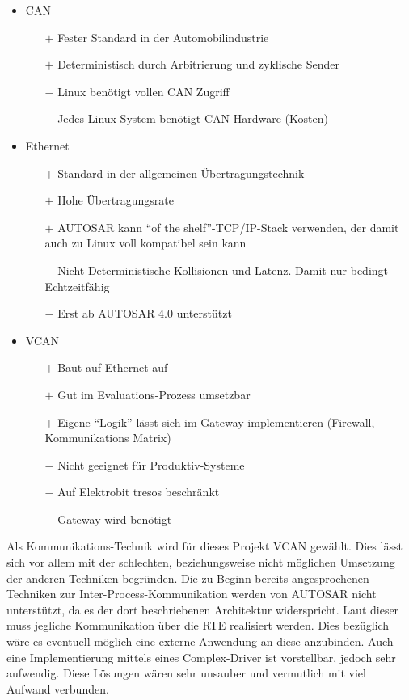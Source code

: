 \documentclass[
  a4paper,					    %
  twoside,
  DIV=calc,     				%
  bibliography=totoc,
  cleardoublepage=empty,
  ngerman,     					%
  final       					%
]{scrbook}
\begin{document}
\begin{itemize}
    \item CAN
    \begin{itemize}
        \item[$+$] Fester Standard in der Automobilindustrie
        \item[$+$] Deterministisch durch Arbitrierung und zyklische Sender
        \item[$-$] Linux benötigt vollen CAN Zugriff
        \item[$-$] Jedes Linux-System benötigt CAN-Hardware (Kosten)
    \end{itemize}
    \item Ethernet
    \begin{itemize}
        \item[$+$] Standard in der allgemeinen Übertragungstechnik
        \item[$+$] Hohe Übertragungsrate
        \item[$+$] AUTOSAR kann "`of the shelf"'-TCP/IP-Stack verwenden, der damit auch zu Linux voll kompatibel sein kann\cite[S. 21]{autosar_eth}
        \item[$-$] Nicht-Deterministische Kollisionen und Latenz. Damit nur bedingt Echtzeitfähig
        \item[$-$] Erst ab AUTOSAR 4.0 unterstützt
    \end{itemize}
    \item VCAN
    \begin{itemize}
        \item[$+$] Baut auf Ethernet auf
        \item[$+$] Gut im Evaluations-Prozess umsetzbar
        \item[$+$] Eigene "`Logik"' lässt sich im Gateway implementieren (Firewall, Kommunikations Matrix)
        \item[$-$] Nicht geeignet für Produktiv-Systeme
        \item[$-$] Auf Elektrobit tresos beschränkt
        \item[$-$] Gateway wird benötigt
    \end{itemize}
\end{itemize}

Als Kommunikations-Technik wird für dieses Projekt VCAN gewählt. Dies lässt sich vor allem mit der schlechten, beziehungsweise nicht möglichen Umsetzung der anderen Techniken begründen. Die zu Beginn bereits angesprochenen Techniken zur Inter-Process-Kommunikation werden von AUTOSAR nicht unterstützt, da es der dort beschriebenen Architektur widerspricht. Laut dieser muss jegliche Kommunikation über die RTE realisiert werden. Dies bezüglich wäre es eventuell möglich eine externe Anwendung an diese anzubinden. Auch eine Implementierung mittels eines Complex-Driver ist vorstellbar, jedoch sehr aufwendig. Diese Lösungen wären sehr unsauber und vermutlich mit viel Aufwand verbunden.
\end{document}
